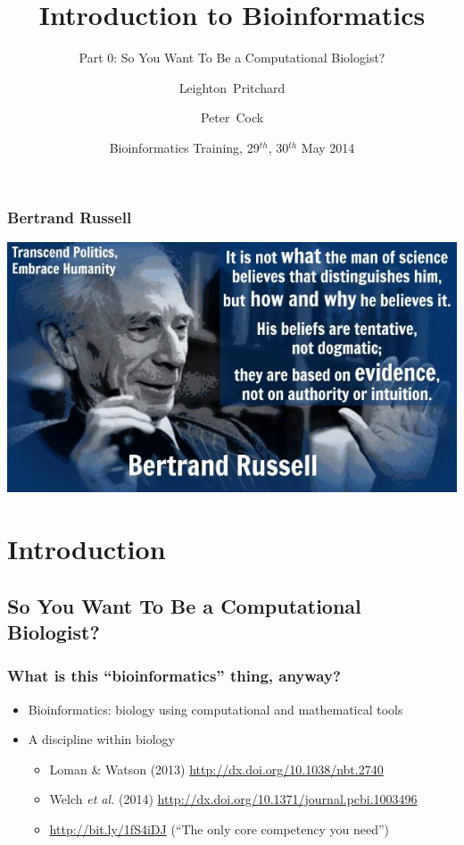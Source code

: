 \documentclass[table]{beamer}
\title[Intro to Bioinformatics] %
{Introduction to Bioinformatics}
\subtitle{Part 0: So You Want To Be a Computational Biologist?}
\author[Pritchard, Cock] %
{Leighton~Pritchard \and Peter~Cock}
\institute[The James Hutton Institute] %
{
  Information and Computational Sciences\\
  The James Hutton Institute
}
\date[May 2014] %
{Bioinformatics Training, 29$^{th}$, 30$^{th}$ May 2014}
\begin{document}
  \frame[plain]{\titlepage}
  
  \begin{frame}
    \frametitle{Bertrand Russell}
    \begin{center}
      \includegraphics[width=\textwidth]{images/bertrand}
    \end{center}
  \end{frame}
    
  \section{Introduction}
  \subsection{So You Want To Be a Computational Biologist?}
  \begin{frame}
    \frametitle{What is this ``bioinformatics'' thing, anyway?}
    \begin{itemize}
      \item Bioinformatics: biology using computational and mathematical tools
      \item A discipline within biology
      \begin{itemize}
        \item Loman \& Watson (2013) \url{http://dx.doi.org/10.1038/nbt.2740}
        \item Welch \textit{et al.} (2014) \url{http://dx.doi.org/10.1371/journal.pcbi.1003496}
        \item \url{http://bit.ly/1fS4iDJ} (``The only core competency you need'')
      \end{itemize}
    \end{itemize}
  \end{frame}
\end{document}
